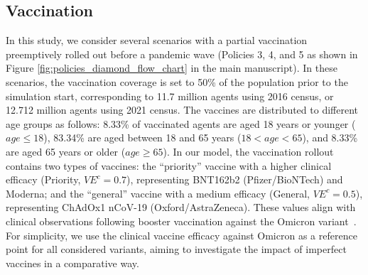 \documentclass{article}
\begin{document}
\begin{appendices}
\renewcommand{\arraystretch}{1.3}
\begin{table}[ht]
    \centering
    \caption{The macro-distancing parameters (population fractions) and micro-distancing (interaction strengths) for the considered NPIs. The micro-duration of CI is limited by the disease progression in the affected agent $i$,  $D(i)$. Compliance levels for SC for students/teachers and parents can be different, as indicated by distinct settings for $SC^{s/t}$ and $SC^p$ respectively. }
   \label{tab:NPI}
\end{table}

\vspace*{-0.5cm}
\subsection{Vaccination}
\label{sec_supp:vac}
In this study, we consider several scenarios with a partial vaccination preemptively rolled out before a pandemic wave (Policies 3, 4, and 5 as shown in Figure \ref{fig:policies_diamond_flow_chart} in the main manuscript). In these scenarios, the vaccination coverage is set to 50\% of the population prior to the  simulation start, corresponding to 11.7 million agents using 2016 census, or 12.712 million agents using 2021 census. The vaccines are distributed to different age groups as follows: 8.33\% of vaccinated agents are aged 18 years or younger ($age \leq 18$), 83.34\% are aged between 18 and 65 years ($18 < age <65$), and 8.33\% are aged 65 years or older ($age \geq 65$). In our model, the vaccination rollout contains two types of vaccines: the ``priority'' vaccine with a higher clinical efficacy (Priority, $VE^c=0.7$), representing BNT162b2 (Pfizer/BioNTech) and Moderna;  and the ``general'' vaccine with a medium efficacy (General, $VE^c=0.5$), representing ChAdOx1 nCoV-19 (Oxford/AstraZeneca). These values align with clinical observations following booster vaccination against the Omicron variant~\cite{Andrews2022}. For simplicity, we use the clinical vaccine efficacy against Omicron as a reference point for all considered variants, aiming to investigate the impact of imperfect vaccines in a comparative way. 


\end{appendices}
\end{document}
